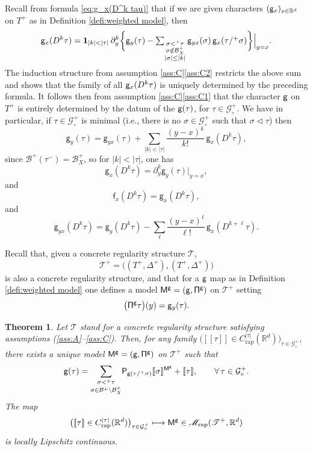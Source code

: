 \documentclass[11pt]{article}
\newcommand{\ie}{i.e.,\xspace}
\numberwithin{equation}{section}
\newcommand\mto{\mathchoice{\longmapsto}{\mapsto}{\mapsto}{\mapsto}}
\theoremstyle{plain}
\newtheorem{thm}{Theorem}
\theoremstyle{definition}
\newcommand{\unit}{\mathbf{1}}
\newcommand{\Brac}[1]{[\![#1]\!]}
\newcommand{\rap}{\mathrm{rap}}
\newcommand{\sfM}{\mathsf{M}}
\newcommand{\sfP}{\mathsf{P}}
\newcommand{\sff}{\mathsf{f}}
\newcommand{\sfg}{\mathsf{g}}
\newcommand{\scrM}{\mathscr{M}}
\newcommand{\scrT}{\mathscr{T}}
\let\spord\triangleleft
\newcommand{\bbR}{\mathbb{R}}
\newcommand{\mcB}{\mathcal{B}}
\newcommand{\mcG}{\mathcal{G}}
\begin{document}
Recall from formula \eqref{eq:g_x(D^k tau)} that if we are given characters $({\sf g}_x)_{x\in\bbR^d}$ on $T^+$ as in Definition \ref{defi:weighted model}, then
\begin{equation} \label{EqGxDkTau}
{\sf g}_x(D^k\tau) = \unit_{|k|<|\tau|}\, \partial_y^k\bigg\{\sfg_y(\tau) - \textstyle\sum_{\substack{\sigma<^+\tau\\\sigma\notin\mcB_X^+\\|\sigma| \le |k|}} \sfg_{yx}(\sigma)\,\sfg_x(\tau/^+\sigma)\bigg\}\Big|_{y=x}.
\end{equation}
The induction structure from assumption \ref{ass:C}\eqref{ass:C2} restricts the above sum and shows that the family of all ${\sf g}_x(D^k\tau)$ is uniquely determined by the preceding formula. It follows then from assumption \ref{ass:C}\eqref{ass:C1} that the character $\sf g$ on $T^+$ is entirely determined by the datum of the ${\sf g}(\tau)$, for $\tau\in\mcG_\circ^+$. We have in particular, if $\tau\in\mcG_\circ^+$ is minimal (\ie there is no $\sigma\in\mcG_\circ^+$ such that $\sigma\spord\tau$) then
\[
\sfg_y(\tau) = \sfg_{yx}(\tau) + \sum_{\vert k\vert<\vert\tau\vert}\frac{(y-x)^k}{k!}\,\sfg_x(D^k\tau),
\]
since $\mcB^+(\tau^-)=\mcB_X^+$, so for $\vert k\vert<\vert\tau\vert$, one has
\begin{equation} \label{EqDefnGD}
\sfg_x(D^k\tau) = \partial^k_y\sfg_y(\tau)\big\vert_{y=x},
\end{equation}
and
\[
\sff_x(D^k\tau) = \sfg_x(D^k\tau),
\]
and
\begin{equation} \label{EqDefnG2D}
\sfg_{yx}(D^k\tau) = \sfg_y(D^k\tau) - \sum_\ell \frac{(y-x)^\ell}{\ell !}\,\sfg_x(D^{k+\ell}\tau).
\end{equation}

Recall that, given a concrete regularity structure $\scrT$,
\[
\scrT^+ = \bigl((T^+,\Delta^+),(T^+,\Delta^+)\bigr)
\]
is also a concrete regularity structure, and that for a $\sf g$ map as in Definition \ref{defi:weighted model} one defines a model ${\sf M^g = (g,\Pi^g)}$ on $\scrT^+$ setting
\[
\bigl({\sf \Pi^g}\tau\bigr)(y) = {\sf g}_{y}(\tau).
\]

\begin{thm} \label{mainresult:reconst of g}
Let $\scrT$ stand for a concrete regularity structure satisfying assumptions \textup{(\ref{ass:A}--\ref{ass:C})}. Then, for any family $\bigl(\Brac{\tau}\in C^{|\tau|}_\rap(\bbR^d)\bigr)_{\tau\in\mcG^+_\circ}$, there exists a unique model $\sfM^{\sf g} = (\sfg,{\sf\Pi}^\sfg)$ on $\scrT^+$ such that
\begin{equation} \label{EqgTau}
{\sf g}(\tau) = \underset{\sigma\in\mcB^+\setminus \mcB_X^+}{\sum_{\sigma<^+\tau}} \sfP_{\sfg(\tau/^+\sigma)}\Brac{\sigma}^{{\sf M}^{\sfg}} + \Brac{\tau}, \qquad \forall\,\tau\in\mcG^+_\circ.
\end{equation}
The map
\begin{equation} \label{EqMap}
\bigl(\Brac{\tau}\in C^{|\tau|}_\rap(\bbR^d)\bigr)_{\tau\in\mcG^+_\circ} \mto {\sf M^g}\in\scrM_\rap(\scrT^+,\bbR^d)
\end{equation}
is locally Lipschitz continuous.
\end{thm}
\end{document}
